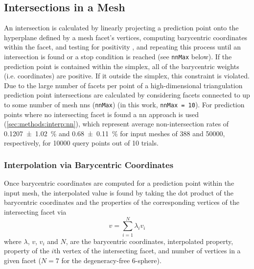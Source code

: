 \subsection{Intersections in a  Mesh}
\label{app:bary-int}
An intersection is calculated by linearly projecting a prediction point onto the hyperplane defined by a mesh facet's vertices, computing barycentric coordinates within the facet, and testing for positivity \cite{langerSphericalBarycentricCoordinates2006}, and repeating this process until an intersection is found or a stop condition is reached (see \texttt{nnMax} below). If the prediction point is contained within the simplex, all of the barycentric weights (i.e. coordinates) are positive. If it outside the simplex, this constraint is violated. Due to the large number of facets per point of a high-dimensional
triangulation
prediction point intersections are calculated by considering facets connected to up to some number of mesh \glspl{nn} (\texttt{nnMax}) (in this work, \texttt{nnMax = 10}). For prediction points where no intersecting facet is found
a \gls{nn} approach is used (\cref{sec:methods:interp:nn}), which represent average non-intersection rates of \SI{0.1207 \pm 1.02}{\percent} and \SI{0.68 \pm 0.11}{\percent} for input meshes of \num{388} and \num{50000}, respectively, for \num{10000} query points out of \num{10} trials.

\subsubsection{Interpolation via Barycentric Coordinates}
\label{app:bary-interp}

Once barycentric coordinates are computed for a prediction point within the input mesh, the interpolated value is found by taking the dot product of the barycentric coordinates and the properties of the corresponding vertices of the intersecting facet via
\begin{equation}
v=\underset{i=1}{\overset{N}{\sum }}\lambda _i v_i
\end{equation}
where $\lambda$, $v$, $v_i$ and $N$, are the barycentric coordinates, interpolated property, property of the $i$th vertex of the intersecting facet, and number of vertices in a given facet ($N = 7$ for the degeneracy-free 6-sphere).